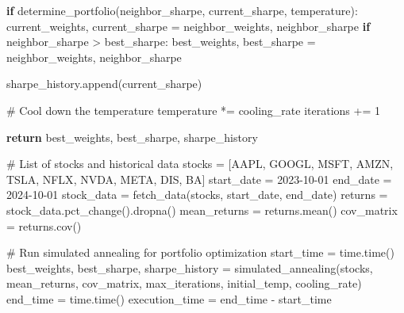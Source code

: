 \documentclass[
  letterpaper,
  DIV=11,
  numbers=noendperiod]{scrreprt}
\newenvironment{Shaded}{\begin{snugshade}}{\end{snugshade}}
\newcommand{\CommentTok}[1]{\textcolor[rgb]{0.37,0.37,0.37}{#1}}
\newcommand{\ControlFlowTok}[1]{\textcolor[rgb]{0.00,0.23,0.31}{\textbf{#1}}}
\newcommand{\DecValTok}[1]{\textcolor[rgb]{0.68,0.00,0.00}{#1}}
\newcommand{\NormalTok}[1]{\textcolor[rgb]{0.00,0.23,0.31}{#1}}
\newcommand{\OperatorTok}[1]{\textcolor[rgb]{0.37,0.37,0.37}{#1}}
\newcommand{\StringTok}[1]{\textcolor[rgb]{0.13,0.47,0.30}{#1}}
\begin{document}
\begin{Shaded}
\begin{Highlighting}[]
        \ControlFlowTok{if}\NormalTok{ determine\_portfolio(neighbor\_sharpe, current\_sharpe, temperature):}
\NormalTok{            current\_weights, current\_sharpe }\OperatorTok{=}\NormalTok{ neighbor\_weights, neighbor\_sharpe}
            \ControlFlowTok{if}\NormalTok{ neighbor\_sharpe }\OperatorTok{\textgreater{}}\NormalTok{ best\_sharpe:}
\NormalTok{                best\_weights, best\_sharpe }\OperatorTok{=}\NormalTok{ neighbor\_weights, neighbor\_sharpe}

\NormalTok{        sharpe\_history.append(current\_sharpe)}

        \CommentTok{\# Cool down the temperature}
\NormalTok{        temperature }\OperatorTok{*=}\NormalTok{ cooling\_rate}
\NormalTok{        iterations }\OperatorTok{+=} \DecValTok{1}

    \ControlFlowTok{return}\NormalTok{ best\_weights, best\_sharpe, sharpe\_history}

\CommentTok{\# List of stocks and historical data}
\NormalTok{stocks }\OperatorTok{=}\NormalTok{ [}\StringTok{\textquotesingle{}AAPL\textquotesingle{}}\NormalTok{, }\StringTok{\textquotesingle{}GOOGL\textquotesingle{}}\NormalTok{, }\StringTok{\textquotesingle{}MSFT\textquotesingle{}}\NormalTok{, }\StringTok{\textquotesingle{}AMZN\textquotesingle{}}\NormalTok{, }\StringTok{\textquotesingle{}TSLA\textquotesingle{}}\NormalTok{, }\StringTok{\textquotesingle{}NFLX\textquotesingle{}}\NormalTok{, }\StringTok{\textquotesingle{}NVDA\textquotesingle{}}\NormalTok{, }\StringTok{\textquotesingle{}META\textquotesingle{}}\NormalTok{, }\StringTok{\textquotesingle{}DIS\textquotesingle{}}\NormalTok{, }\StringTok{\textquotesingle{}BA\textquotesingle{}}\NormalTok{]}
\NormalTok{start\_date }\OperatorTok{=} \StringTok{\textquotesingle{}2023{-}10{-}01\textquotesingle{}}
\NormalTok{end\_date }\OperatorTok{=} \StringTok{\textquotesingle{}2024{-}10{-}01\textquotesingle{}}
\NormalTok{stock\_data }\OperatorTok{=}\NormalTok{ fetch\_data(stocks, start\_date, end\_date)}
\NormalTok{returns }\OperatorTok{=}\NormalTok{ stock\_data.pct\_change().dropna()}
\NormalTok{mean\_returns }\OperatorTok{=}\NormalTok{ returns.mean()}
\NormalTok{cov\_matrix }\OperatorTok{=}\NormalTok{ returns.cov()}

\CommentTok{\# Run simulated annealing for portfolio optimization}
\NormalTok{start\_time }\OperatorTok{=}\NormalTok{ time.time()}
\NormalTok{best\_weights, best\_sharpe, sharpe\_history }\OperatorTok{=}\NormalTok{ simulated\_annealing(stocks, mean\_returns, cov\_matrix, max\_iterations, initial\_temp, cooling\_rate)}
\NormalTok{end\_time }\OperatorTok{=}\NormalTok{ time.time()}
\NormalTok{execution\_time }\OperatorTok{=}\NormalTok{ end\_time }\OperatorTok{{-}}\NormalTok{ start\_time}


\end{Highlighting}
\end{Shaded}
\end{document}
